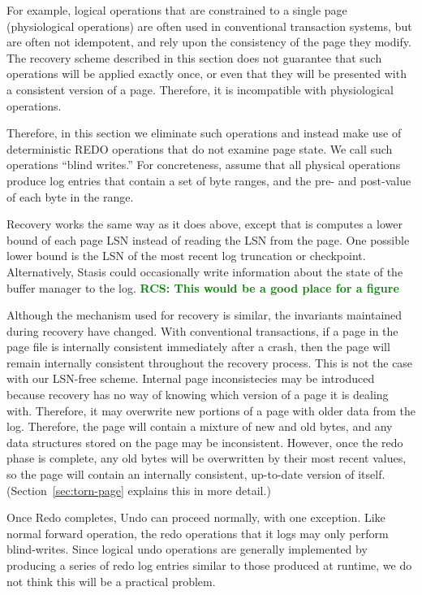 \documentclass[letterpaper,twocolumn,10pt]{article}
\newcommand{\yad}{Stasis\xspace}
\newcommand{\rcs}[1]{\textcolor{green}{\bf RCS: #1}}
\begin{document}
For example, logical operations that are constrained to a single page
(physiological operations) are often used in conventional transaction
systems, but are often not idempotent, and rely upon the consistency
of the page they modify.  The recovery scheme described in this
section does not guarantee that such operations will be applied
exactly once, or even that they will be presented with a consistent
version of a page.  Therefore, it is incompatible with physiological
operations.

Therefore, in this section we eliminate such operations and instead
make use of deterministic REDO operations that do not examine page
state.  We call such operations ``blind writes.''  For concreteness,
assume that all physical operations produce log entries that contain a
set of byte ranges, and the pre- and post-value of each byte in the
range.

Recovery works the same way as it does above, except that is computes
a lower bound of each page LSN instead of reading the LSN from the
page.  One possible lower bound is the LSN of the most recent log
truncation or checkpoint.  Alternatively, \yad could occasionally
write information about the state of the buffer manager to the log. \rcs{This would be a good place for a figure}

Although the mechanism used for recovery is similar, the invariants
maintained during recovery have changed.  With conventional
transactions, if a page in the page file is internally consistent
immediately after a crash, then the page will remain internally
consistent throughout the recovery process.  This is not the case with
our LSN-free scheme.  Internal page inconsistecies may be introduced
because recovery has no way of knowing which version of a page it is
dealing with.  Therefore, it may overwrite new portions of a page with
older data from the log.
Therefore, the page will contain a mixture of new and old bytes, and
any data structures stored on the page may be inconsistent.  However,
once the redo phase is complete, any old bytes will be overwritten by
their most recent values, so the page will contain an internally
consistent, up-to-date version of itself.
(Section~\ref{sec:torn-page} explains this in more detail.)

Once Redo completes, Undo can proceed normally, with one exception.
Like normal forward operation, the redo operations that it logs may
only perform blind-writes.  Since logical undo operations are
generally implemented by producing a series of redo log entries
similar to those produced at runtime, we do not think this will be a
practical problem.
\end{document}
